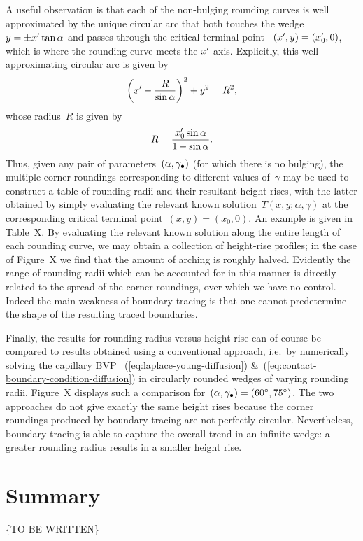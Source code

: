 A useful observation is that
each of the non-bulging rounding curves is well approximated
by the unique circular arc
that both touches the wedge~$y = \pm x' \tan\alpha$
and passes through the critical terminal point~%
  $(x', y) = (x'_0, 0)$,
which is where the rounding curve meets the $x'$-axis.
Explicitly, this well-approximating circular arc is given by
\begin{equation}
  \roundbr*{\offset{x} - \frac{R}{\sin\alpha}}^2 + y^2 = R^2,
  \label{eq:moderate-well-approximating-rounding-circle}
\end{equation}
whose radius~$R$ is given by
\begin{equation}
  R = \frac{\offset{x}_0 \sin\alpha}{1 - \sin\alpha}.
  \label{eq:moderate-well-approximating-rounding-radius}
\end{equation}
Thus, given any pair of parameters~$(\alpha, \gamma_\bullet)$
(for which there is no bulging),
the multiple corner roundings corresponding to different values of~$\gamma$
may be used to construct a table of rounding radii
and their resultant height rises,
with the latter obtained by simply
evaluating the relevant known solution~$T (x, y; \alpha, \gamma)$
at the corresponding critical terminal point~$(x, y) = (x_0, 0)$.
An example is given in Table~X. %
By evaluating the relevant known solution
along the entire length of each rounding curve,
we may obtain a collection of height-rise profiles;
in the case of Figure~X %
we find that the amount of arching is roughly halved.
Evidently the range of rounding radii
which can be accounted for in this manner
is directly related to the spread of the corner roundings,
over which we have no control.
Indeed the main weakness of boundary tracing is that
one cannot predetermine the shape of the resulting traced boundaries.

Finally, the results for rounding radius versus height rise
can of course be compared
to results obtained using a conventional approach,
i.e.~by numerically solving the capillary BVP~%
  (\ref{eq:laplace-young-diffusion})
\&~(\ref{eq:contact-boundary-condition-diffusion})
in circularly rounded wedges of varying rounding radii.
Figure~X %
displays such a comparison
for~$(\alpha, \gamma_\bullet) = (\SI{60}{\degree}, \SI{75}{\degree})$.
The two approaches do not give exactly the same height rises
because the corner roundings produced by boundary tracing
are not perfectly circular.
Nevertheless, boundary tracing is able to capture
the overall trend in an infinite wedge:
a greater rounding radius results in a smaller height rise.

\section{Summary}
\label{sec:moderate.summary}

\{TO BE WRITTEN\}
